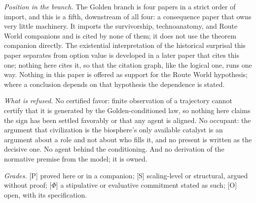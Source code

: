 \emph{Position in the branch.} The Golden branch is four papers in a
strict order of import, and this is a fifth, downstream of all four: a
consequence paper that owns very little machinery. It imports the
survivorship, technoanatomy, and Route World companions and is cited
by none of them; it does not use the theorem companion directly. The
existential interpretation of the historical surprisal this paper
separates from option value is developed in a later paper that cites
this one; nothing here cites it, so that the citation graph, like the
logical one, runs one way. Nothing in this paper is offered as support for the Route World
hypothesis; where a conclusion depends on that hypothesis the
dependence is stated.

\emph{What is refused.} No certified favor: finite observation of a
trajectory cannot certify that it is generated by the Golden-conditioned
law, so nothing here claims the sign has been settled favorably or that
any agent is aligned. No occupant: the argument that civilization is
the biosphere's only available catalyst is an argument about a role and
not about who fills it, and no present is written as the decisive one.
No agent behind the conditioning. And no derivation of the normative
premise from the model; it is owned.

\emph{Grades.} [P] proved here or in a companion; [S] scaling-level or
structural, argued without proof; [$\Phi$] a stipulative or evaluative
commitment stated as such; [O] open, with its specification.

